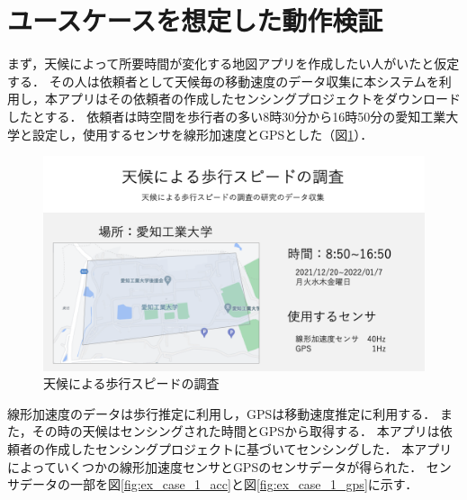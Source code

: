 \section{ユースケースを想定した動作検証}
まず，天候によって所要時間が変化する地図アプリを作成したい人がいたと仮定する．
その人は依頼者として天候毎の移動速度のデータ収集に本システムを利用し，本アプリはその依頼者の作成したセンシングプロジェクトをダウンロードしたとする．
依頼者は時空間を歩行者の多い8時30分から16時50分の愛知工業大学と設定し，使用するセンサを線形加速度とGPSとした（図\ref{fig:ex_case_1}）．

\begin{figure}[tbh]
    \centering
    \includegraphics[width=16cm]{img_ex_case_1.png}
    \caption{天候による歩行スピードの調査}
    \label{fig:ex_case_1}
\end{figure}

線形加速度のデータは歩行推定に利用し，GPSは移動速度推定に利用する．
また，その時の天候はセンシングされた時間とGPSから取得する．
本アプリは依頼者の作成したセンシングプロジェクトに基づいてセンシングした．
本アプリによっていくつかの線形加速度センサとGPSのセンサデータが得られた．
センサデータの一部を図\ref{fig:ex_case_1_acc}と図\ref{fig:ex_case_1_gps}に示す．

